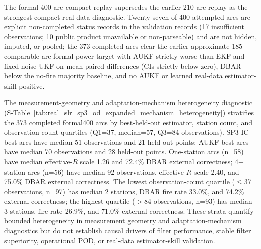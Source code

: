 \documentclass{article}
\begin{document}
The formal 400-arc compact replay supersedes the earlier 210-arc replay as the strongest compact real-data diagnostic. Twenty-seven of 400 attempted arcs are explicit non-completed status records in the validation records (17 insufficient observations; 10 public product unavailable or non-parseable) and are not hidden, imputed, or pooled; the 373 completed arcs clear the earlier approximate 185 comparable-arc formal-power target with AUKF strictly worse than EKF and fixed-noise UKF on mean paired differences (CIs strictly below zero), DBAR below the no-fire majority baseline, and no AUKF or learned real-data estimator-skill positive.

The measurement-geometry and adaptation-mechanism heterogeneity diagnostic (S-Table~\ref{tab:real_slr_sp3_od_expanded_mechanism_heterogeneity}) stratifies the 373 completed formal400 arcs by best-held-out estimator, station count, and observation-count quartiles (Q1=37, median=57, Q3=84 observations). SP3-IC-best arcs have median 51 observations and 21 held-out points; AUKF-best arcs have median 70 observations and 28 held-out points. One-station arcs (n=58) have median effective-$R$ scale 1.26 and 72.4\% DBAR external correctness; 4+ station arcs (n=56) have median 92 observations, effective-$R$ scale 2.40, and 75.0\% DBAR external correctness. The lowest observation-count quartile ($\leq$37 observations, n=97) has median 2 stations, DBAR fire rate 33.0\%, and 74.2\% external correctness; the highest quartile ($>$84 observations, n=93) has median 3 stations, fire rate 26.9\%, and 71.0\% external correctness. These strata quantify bounded heterogeneity in measurement geometry and adaptation-mechanism diagnostics but do not establish causal drivers of filter performance, stable filter superiority, operational POD, or real-data estimator-skill validation.
\end{document}
